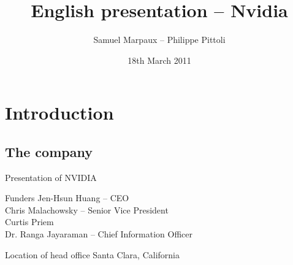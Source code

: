 \documentclass{beamer}
\date{18th March 2011}
\author{Samuel Marpaux -- Philippe Pittoli}
\title[Nvidia]{English presentation -- Nvidia}
\begin{document}

\section{Introduction}
\subsection{The company}
\begin{frame}{Presentation of NVIDIA}
	\begin{block}{Funders}
		Jen-Hsun Huang -- CEO\\
		Chris Malachowsky -- Senior Vice President\\
		Curtis Priem \\
		Dr. Ranga Jayaraman -- Chief Information Officer
	\end{block}

	\pause

	\begin{block}{Location of head office}
		Santa Clara, California
	\end{block}
\end{frame}
\end{document}

